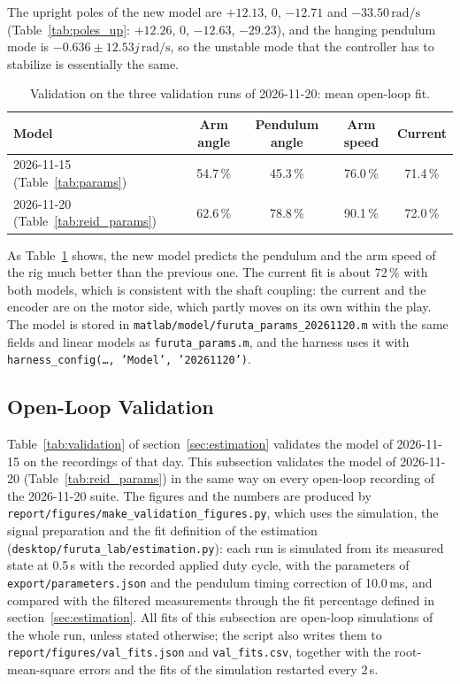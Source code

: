 \documentclass[a4paper,11pt]{article}
\begin{document}
The upright poles of the new model are $+12.13$, $0$, $-12.71$ and $-33.50\,\mathrm{rad/s}$ (Table~\ref{tab:poles_up}: $+12.26$, $0$, $-12.63$, $-29.23$), and the hanging pendulum mode is $-0.636 \pm 12.53j\,\mathrm{rad/s}$, so the unstable mode that the controller has to stabilize is essentially the same.

\begin{table}[h]
\centering
\caption{Validation on the three validation runs of 2026-11-20: mean open-loop fit.}
\label{tab:reid_validation}
\small
\begin{tabular}{@{}lcccc@{}}
\toprule
Model & Arm angle & Pendulum angle & Arm speed & Current \\
\midrule
2026-11-15 (Table~\ref{tab:params}) & 54.7\,\% & 45.3\,\% & 76.0\,\% & 71.4\,\% \\
2026-11-20 (Table~\ref{tab:reid_params}) & 62.6\,\% & 78.8\,\% & 90.1\,\% & 72.0\,\% \\
\bottomrule
\end{tabular}
\end{table}

As Table~\ref{tab:reid_validation} shows, the new model predicts the pendulum and the arm speed of the rig much better than the previous one. The current fit is about 72\,\% with both models, which is consistent with the shaft coupling: the current and the encoder are on the motor side, which partly moves on its own within the play. The model is stored in \nolinkurl{matlab/model/furuta_params_20261120.m} with the same fields and linear models as \nolinkurl{furuta_params.m}, and the harness uses it with \texttt{harness\_config(\ldots, 'Model', '20261120')}.

\subsection{Open-Loop Validation}
\label{sec:reid_val}
Table~\ref{tab:validation} of section~\ref{sec:estimation} validates the model of 2026-11-15 on the recordings of that day. This subsection validates the model of 2026-11-20 (Table~\ref{tab:reid_params}) in the same way on every open-loop recording of the 2026-11-20 suite. The figures and the numbers are produced by \nolinkurl{report/figures/make_validation_figures.py}, which uses the simulation, the signal preparation and the fit definition of the estimation (\nolinkurl{desktop/furuta_lab/estimation.py}): each run is simulated from its measured state at 0.5\,s with the recorded applied duty cycle, with the parameters of \nolinkurl{export/parameters.json} and the pendulum timing correction of 10.0\,ms, and compared with the filtered measurements through the fit percentage defined in section~\ref{sec:estimation}. All fits of this subsection are open-loop simulations of the whole run, unless stated otherwise; the script also writes them to \nolinkurl{report/figures/val_fits.json} and \nolinkurl{val_fits.csv}, together with the root-mean-square errors and the fits of the simulation restarted every 2\,s.
\end{document}

